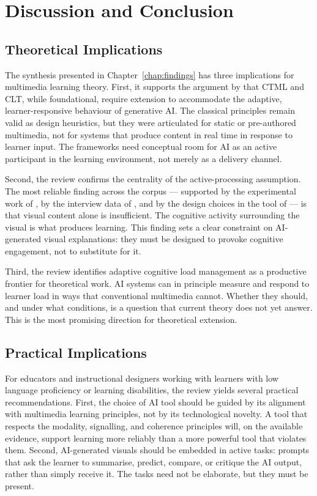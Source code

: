 %
%
\chapter{Discussion and Conclusion}
\label{chap:discussion}
\setlength{\parskip}{1em}
%
\section{Theoretical Implications}

The synthesis presented in Chapter~\ref{chap:findings} has three implications for multimedia learning theory. First, it supports the argument by \citet{twabu2025} that CTML and CLT, while foundational, require extension to accommodate the adaptive, learner-responsive behaviour of generative AI. The classical principles remain valid as design heuristics, but they were articulated for static or pre-authored multimedia, not for systems that produce content in real time in response to learner input. The frameworks need conceptual room for AI as an active participant in the learning environment, not merely as a delivery channel.

Second, the review confirms the centrality of the active-processing assumption. The most reliable finding across the corpus --- supported by the experimental work of \citet{lawson2024}, by the interview data of \citet{buhler2024}, and by the design choices in the tool of \citet{osman2024} --- is that visual content alone is insufficient. The cognitive activity surrounding the visual is what produces learning. This finding sets a clear constraint on AI-generated visual explanations: they must be designed to provoke cognitive engagement, not to substitute for it.

Third, the review identifies adaptive cognitive load management as a productive frontier for theoretical work. AI systems can in principle measure and respond to learner load in ways that conventional multimedia cannot. Whether they should, and under what conditions, is a question that current theory does not yet answer. This is the most promising direction for theoretical extension.

\section{Practical Implications}

For educators and instructional designers working with learners with low language proficiency or learning disabilities, the review yields several practical recommendations. First, the choice of AI tool should be guided by its alignment with multimedia learning principles, not by its technological novelty. A tool that respects the modality, signalling, and coherence principles will, on the available evidence, support learning more reliably than a more powerful tool that violates them. Second, AI-generated visuals should be embedded in active tasks: prompts that ask the learner to summarise, predict, compare, or critique the AI output, rather than simply receive it. The tasks need not be elaborate, but they must be present.

